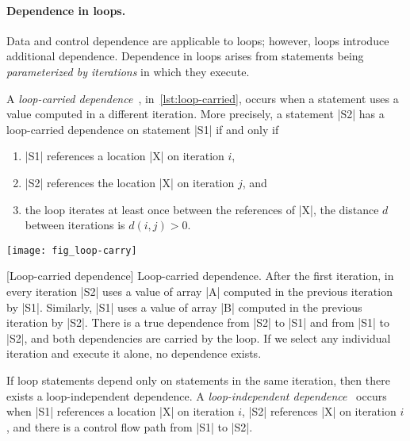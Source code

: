 \paragraph*{Dependence in loops.}
Data and control dependence are applicable to loops;
however, loops introduce additional dependence.
Dependence in loops arises from statements being \emph{parameterized by iterations} in which they execute.

A \emph{loop-carried dependence}~\cite[p. 73]{kennedy2001}, in~\autoref{lst:loop-carried},
occurs when a statement uses a value computed in a different iteration.
More precisely, a statement \pr|S2| has a loop-carried dependence on statement \pr|S1| if and only if
\begin{enumerate}
\item \pr|S1| references a location \pr|X| on iteration \(i\),
\item \pr|S2| references the location \pr|X| on iteration \(j\), and
\item the loop iterates at least once between the references of \pr|X|, \ie the distance \(d\) between iterations is \(d(i, j) > 0\).
\end{enumerate}

\begin{center}
\begin{minipage}{.4\textwidth}
\end{minipage}%
\hfill%
\begin{minipage}{.5\textwidth}
{\centering\texttt{[image: fig\_loop-carry]}}
\end{minipage}
[Loop-carried dependence]{
Loop-carried dependence.
After the first iteration, in every iteration \pr|S2| uses a value of array \pr|A| computed in the previous iteration by \pr|S1|.
Similarly, \pr|S1| uses a value of array \pr|B| computed in the previous iteration by \pr|S2|.
There is a true dependence from \pr|S2| to \pr|S1| and from \pr|S1| to \pr|S2|, and both dependencies are carried by the loop.
If we select any individual iteration and execute it alone, no dependence exists.
}\label{lst:loop-carried}
\end{center}

If loop statements depend only on statements in the {same iteration}, then there exists a loop-independent dependence.
A \emph{loop-independent dependence}~\cite[p. 76]{kennedy2001} occurs when
\pr|S1| references a location \pr|X| on iteration \(i\),
\pr|S2| references \pr|X| on iteration \(i\),
and there is a control flow path from \pr|S1| to \pr|S2|.

